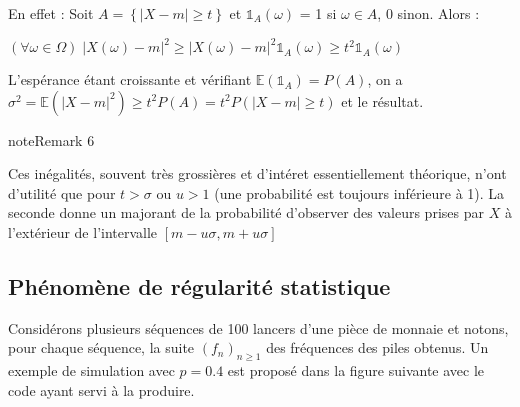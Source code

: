 \documentclass[letterpaper,10pt,french]{sphinxmanual}
\begin{document}
\sphinxAtStartPar
En effet :
Soit \(A=\left \{|X-m|\geq t\right \}\) et \(\mathbb{1}_A(\omega)\) = 1 si \(\omega\in A\), 0 sinon. Alors :

\sphinxAtStartPar
\((\forall \omega\in\Omega)\; |X(\omega)-m|^2\geq |X(\omega)-m|^2\mathbb{1}_A(\omega) \geq t^2\mathbb{1}_A(\omega)\)

\sphinxAtStartPar
L’espérance étant croissante et vérifiant \(\mathbb{E}(\mathbb{1}_A)=P(A)\), on a
\(\sigma^2=\mathbb{E}(|X-m|^2)\geq t^2P(A) = t^2P(|X-m|\geq t)\) et le résultat.
\label{elemstats:remark-5}
\begin{sphinxadmonition}{note}{Remark 6}



\sphinxAtStartPar
Ces inégalités, souvent très grossières et d’intéret essentiellement théorique, n’ont d’utilité que pour \(t>\sigma\) ou \(u>1\) (une probabilité est toujours inférieure à 1). La seconde donne un majorant de la probabilité d’observer des valeurs prises par \(X\) à l’extérieur de l’intervalle \([m-u\sigma,m+u\sigma]\)
\end{sphinxadmonition}


\subsection{Phénomène de régularité statistique}
\label{\detokenize{elemstats:phenomene-de-regularite-statistique}}
\sphinxAtStartPar
Considérons plusieurs séquences de 100 lancers d’une pièce de monnaie et notons, pour chaque séquence, la suite \((f_n)_{n\geq 1}\) des fréquences des piles obtenus. Un exemple de simulation avec \(p=0.4\) est proposé dans la figure suivante avec le code ayant servi à la produire.
\end{document}
